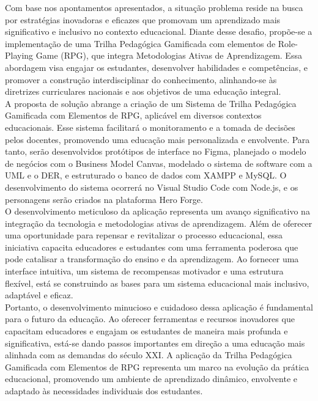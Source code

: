 Com base nos apontamentos apresentados, a situação problema reside na busca por estratégias inovadoras e eficazes que promovam um aprendizado mais significativo e inclusivo no contexto educacional. Diante desse desafio, propõe-se a implementação de uma Trilha Pedagógica Gamificada com elementos de Role-Playing Game (RPG), que integra Metodologias Ativas de Aprendizagem. Essa abordagem visa engajar os estudantes, desenvolver habilidades e competências, e promover a construção interdisciplinar do conhecimento, alinhando-se às diretrizes curriculares nacionais e aos objetivos de uma educação integral.
\\

A proposta de solução abrange a criação de um Sistema de Trilha Pedagógica Gamificada com Elementos de RPG, aplicável em diversos contextos educacionais. Esse sistema facilitará o monitoramento e a tomada de decisões pelos docentes, promovendo uma educação mais personalizada e envolvente. Para tanto, serão desenvolvidos protótipos de interface no Figma, planejado o modelo de negócios com o Business Model Canvas, modelado o sistema de software com a UML e o DER, e estruturado o banco de dados com XAMPP e MySQL. O desenvolvimento do sistema ocorrerá no Visual Studio Code com Node.js, e os personagens serão criados na plataforma Hero Forge.
\\

O desenvolvimento meticuloso da aplicação representa um avanço significativo na integração da tecnologia e metodologias ativas de aprendizagem. Além de oferecer uma oportunidade para repensar e revitalizar o processo educacional, essa iniciativa capacita educadores e estudantes com uma ferramenta poderosa que pode catalisar a transformação do ensino e da aprendizagem. Ao fornecer uma interface intuitiva, um sistema de recompensas motivador e uma estrutura flexível, está se construindo as bases para um sistema educacional mais inclusivo, adaptável e eficaz.
\\

Portanto, o desenvolvimento minucioso e cuidadoso dessa aplicação é fundamental para o futuro da educação. Ao oferecer ferramentas e recursos inovadores que capacitam educadores e engajam os estudantes de maneira mais profunda e significativa, está-se dando passos importantes em direção a uma educação mais alinhada com as demandas do século XXI. A aplicação da Trilha Pedagógica Gamificada com Elementos de RPG representa um marco na evolução da prática educacional, promovendo um ambiente de aprendizado dinâmico, envolvente e adaptado às necessidades individuais dos estudantes.
\\










